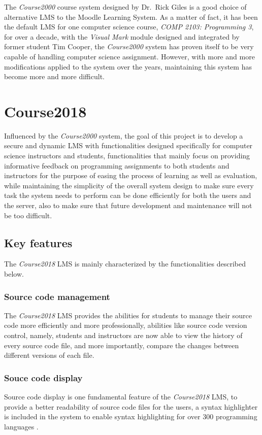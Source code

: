 \medskip

The \emph{Course2000} course system designed by Dr.~Rick Giles is a good choice
of alternative LMS to the Moodle Learning System. As a matter of fact, it has
been the
default LMS for one computer science course, \emph{COMP 2103: Programming 3},
for over a decade, with the \emph{Visual Mark} module designed and integrated
by former student Tim Cooper, the \emph{Course2000} system has proven itself
to be very capable of handling computer science assignment. However, with more
and more modifications applied to the system over the years, maintaining
this system has become more and more difficult.

\section{Course2018}
Influenced by the \emph{Course2000} system, the goal of this project is to
develop a secure and dynamic LMS with functionalities designed specifically for
computer science instructors and students, functionalities that mainly focus on
providing informative feedback on programming assignments to both students
and instructors for the purpose of easing the process of learning as well as
evaluation, while maintaining the simplicity of
the overall system design to make sure every task the system needs to
perform can be done efficiently for both the users and the server, also to make
sure that future development and maintenance will not be too difficult.

\subsection{Key features}
The \emph{Course2018} LMS is mainly characterized by the functionalities
described below.

\subsubsection{Source code management}
The \emph{Course2018} LMS provides the abilities for students to manage
their source code more efficiently and more professionally, abilities like 
source code version control, namely, students and instructors are now able
to view the history of every source code file, and more importantly, compare
the changes between different versions of each file.

\subsubsection{Souce code display}
Source code display is one fundamental feature of the \emph{Course2018} LMS,
to provide a better readability of source code files for the users,
a syntax highlighter is included in the system to enable syntax
highlighting \cite{syntaxHighlighting} for over 300 programming
languages \cite{pygmentsLangs}.

